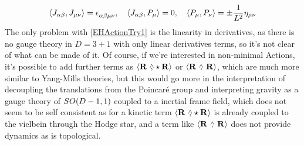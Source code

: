 \begin{align*}
    \expval{J_{\alpha\beta},J_{\mu\nu}}=\tensor{\epsilon}{_\alpha_\beta_\mu_\nu},\ \ \ \expval{J_{\alpha\beta},P_\mu}=0,\ \ \ \expval{P_\mu,P_\nu}=\pm\frac{1}{L^2}\eta_{\mu\nu}
\end{align*}
The only problem with \eqref{EHActionTry1} is the linearity in derivatives, as there is no gauge theory in $D=3+1$ with only linear derivatives terms, so it's not clear of what can be made of it. Of course, if we're interested in non-minimal 
Actions, it's possible to add further terms as $\expval{\vb R\ \wedgecomma\star\vb R}$ or $\expval{\vb R\ \wedgecomma\ \vb R}$, which are much more similar to Yang-Mills theories, but this would go more in the interpretation of 
decoupling the translations from the Poincaré group and interpreting gravity as a gauge theory of $SO\qty(D-1,1)$ coupled to a inertial frame field, which does not seem to be self consistent as for a kinetic term $\expval{\vb R\ \wedgecomma\star\vb R}$ 
is already coupled to the vielbein through the Hodge star, and a term like $\expval{\vb R\ \wedgecomma\ \vb R}$ does not provide dynamics as is topological.